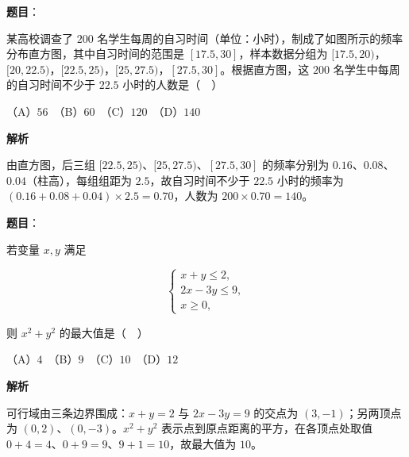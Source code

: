 \begin{answer}

\textbf{题目}：

某高校调查了 \(200\) 名学生每周的自习时间（单位：小时），制成了如图所示的频率分布直方图，其中自习时间的范围是 \([17.5,30]\)，样本数据分组为 \([17.5,20)\)，\([20,22.5)\)，\([22.5,25)\)，\([25,27.5)\)，\([27.5,30]\)。根据直方图，这 \(200\) 名学生中每周的自习时间不少于 \(22.5\) 小时的人数是（　）
\nopagebreak[4]
\begin{center}\end{center}
\nopagebreak[4]
（A）\(56\)　（B）\(60\)　（C）\(120\)　（D）\(140\)

\textbf{解析}

由直方图，后三组 \([22.5,25)\)、\([25,27.5)\)、\([27.5,30]\) 的频率分别为 \(0.16\)、\(0.08\)、\(0.04\)（柱高），每组组距为 \(2.5\)，故自习时间不少于 \(22.5\) 小时的频率为 \((0.16+0.08+0.04)\times 2.5=0.70\)，人数为 \(200\times 0.70=140\)。


\end{answer}
\begin{answer}

\textbf{题目}：

若变量 \(x,y\) 满足

\nopagebreak[4]
\[
\begin{cases}
x+y\leqslant 2,\\
2x-3y\leqslant 9,\\
x\geqslant 0,
\end{cases}
\]

则 \(x^{2}+y^{2}\) 的最大值是（　）

（A）\(4\)　（B）\(9\)　（C）\(10\)　（D）\(12\)

\textbf{解析}

可行域由三条边界围成：\(x+y=2\) 与 \(2x-3y=9\) 的交点为 \((3,-1)\)；另两顶点为 \((0,2)\)、\((0,-3)\)。\(x^{2}+y^{2}\) 表示点到原点距离的平方，在各顶点处取值 \(0+4=4\)、\(0+9=9\)、\(9+1=10\)，故最大值为 \(10\)。


\end{answer}
